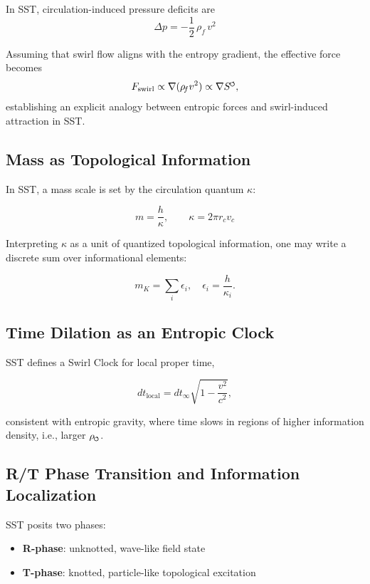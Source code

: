 \documentclass[11pt]{article}
\newcommand{\swirlarrow}{%
    \mathchoice{\mkern-2mu\scriptstyle\boldsymbol{\circlearrowleft}}%
    {\mkern-2mu\scriptstyle\boldsymbol{\circlearrowleft}}%
    {\mkern-2mu\scriptscriptstyle\boldsymbol{\circlearrowleft}}%
    {\mkern-2mu\scriptscriptstyle\boldsymbol{\circlearrowleft}}%
}
\newcommand{\rhof}{\rho_{\!f}}                           %
\begin{document}
        In SST, circulation-induced pressure deficits are
        \begin{equation}
            \Delta p = -\frac{1}{2} \,\rhof\, v^2
        \end{equation}

        Assuming that swirl flow aligns with the entropy gradient, the effective force becomes
        \begin{equation}
            F_\text{swirl} \propto \nabla (\rhof v^2) \propto \nabla S^{\swirlarrow},
        \end{equation}
        establishing an explicit analogy between entropic forces and swirl-induced attraction in SST.

    \subsection{Mass as Topological Information}
        In SST, a mass scale is set by the circulation quantum $\kappa$:

        \begin{equation}
            m = \frac{h}{\kappa}, \qquad \kappa = 2\pi r_c v_c
        \end{equation}

        Interpreting $\kappa$ as a unit of quantized topological information, one may write a discrete sum over informational elements:

        \begin{equation}
            m_K = \sum_i \epsilon_i, \quad \epsilon_i = \frac{h}{\kappa_i}.
        \end{equation}

    \subsection{Time Dilation as an Entropic Clock}
        SST defines a Swirl Clock for local proper time,

        \begin{equation}
            dt_\text{local} = dt_\infty \sqrt{1 - \frac{v^2}{c^2}},
        \end{equation}

        consistent with entropic gravity, where time slows in regions of higher information density, i.e., larger $\rho_{\swirlarrow}$.

    \subsection{R/T Phase Transition and Information Localization}
        SST posits two phases:
        \begin{itemize}
        \item \textbf{R-phase}: unknotted, wave-like field state
        \item \textbf{T-phase}: knotted, particle-like topological excitation
        \end{itemize}
\end{document}
